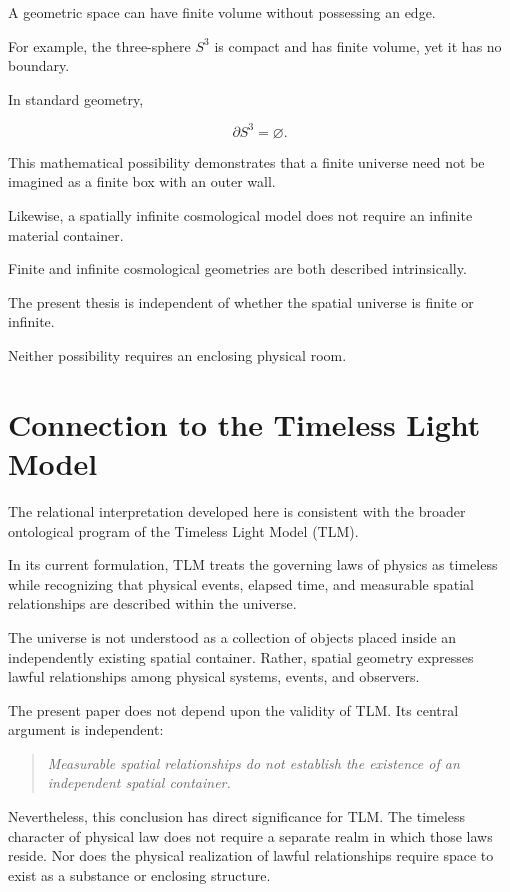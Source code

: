 \documentclass[12pt,onecolumn]{article}
\begin{document}
A geometric space can have
finite volume without possessing
an edge.

For example, the three-sphere
$S^3$ is compact and has finite
volume, yet it has no boundary.

In standard geometry,

\begin{equation}
\partial S^3=\varnothing.
\end{equation}

This mathematical possibility
demonstrates that a finite
universe need not be imagined
as a finite box with an outer wall.

Likewise, a spatially infinite
cosmological model does not
require an infinite material
container.

Finite and infinite cosmological
geometries are both described
intrinsically.

The present thesis is independent
of whether the spatial universe
is finite or infinite.

Neither possibility requires
an enclosing physical room.

\section{Connection to the Timeless Light Model}

The relational interpretation developed here is consistent
with the broader ontological program of the Timeless Light
Model (TLM).

In its current formulation, TLM treats the governing laws of
physics as timeless while recognizing that physical events,
elapsed time, and measurable spatial relationships are
described within the universe.

The universe is not understood as a collection of objects
placed inside an independently existing spatial container.
Rather, spatial geometry expresses lawful relationships
among physical systems, events, and observers.

The present paper does not depend upon the validity of TLM.
Its central argument is independent:

\begin{quote}
\emph{Measurable spatial relationships do not establish the
existence of an independent spatial container.}
\end{quote}

Nevertheless, this conclusion has direct significance for
TLM. The timeless character of physical law does not require
a separate realm in which those laws reside. Nor does the
physical realization of lawful relationships require space
to exist as a substance or enclosing structure.
\end{document}
